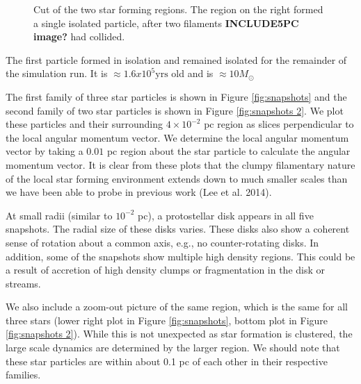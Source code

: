 \documentclass{emulateapj}
\begin{document}
\begin{figure}
\caption{Cut of the two star forming regions. The region on the right formed a single isolated particle, after two filaments {\bf INCLUDE5PC image? } had collided.\label{fig:star forming regions}}
\end{figure}


The first particle formed in isolation and remained isolated for the remainder of the simulation run. It is $\approx 1.6x10^5\text{yrs}$ old and is $\approx 10 M_{\odot}$ 







The first family of three star particles is shown in Figure \ref{fig:snapshots} and the second family of two star particles is shown in Figure \ref{fig:snapshots 2}.  We plot these particles and their surrounding $4\times 10^{-2}$ pc region as slices perpendicular to the local angular momentum vector.  We determine the local angular momentum vector by taking a $0.01$ pc region about the star particle to calculate the angular momentum vector.  It is clear from these plots that the clumpy filamentary nature of the local star forming environment extends down to much smaller scales than we have been able to probe in previous work (Lee et al. 2014).  

At small radii (similar to $10^{-2}$ pc), a protostellar disk appears in all five snapshots. The radial size of these disks varies. These disks also show a coherent sense of rotation about a common axis, e.g., no counter-rotating disks. In addition, some of the snapshots show multiple high density regions. This could be a result of accretion of high density clumps or fragmentation in the disk or streams.  

We also include a zoom-out picture of the same region, which is the same for all three stars (lower right plot in Figure \ref{fig:snapshots}, bottom plot in Figure \ref{fig:snapshots 2}).  While this is not unexpected as star formation is clustered, the large scale dynamics are determined by the larger region.  We should note that these star particles are within about 0.1 pc of each other in their respective families.  

\end{document}
